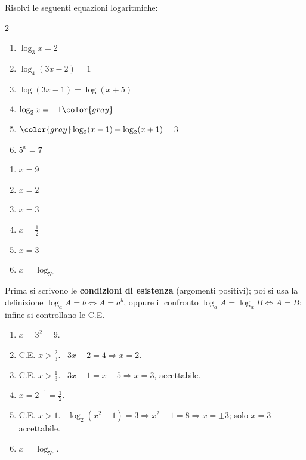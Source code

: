 
\begin{question}[ID=2.2, subtitle={Equazioni logaritmiche elementari (variante)}, difficulty=facile, tags={equazioni logaritmiche, definizione}]
Risolvi le seguenti equazioni logaritmiche:
\begin{center}\begin{minipage}{0.92\linewidth}
\begin{multicols}{2}
\begin{enumerate}[leftmargin=3.2cm]
\item $\log_3 x = 2$
\item $\log_4(3x-2) = 1$
\item $\log(3x-1) = \log(x+5)$
\item $\log_2 x = -1 \color{gray}$
\item $\color{gray}\log_2(x-1) + \log_2(x+1) = 3$
\item $5^x = 7$
\end{enumerate}
\end{multicols}
\end{minipage}\end{center}
\begin{solution}
\begin{enumerate}
    \item $x=9$
    \item $x=2$
    \item $x=3$
    \item $x=\tfrac12$
    \item $x=3$
    \item $x=\log_57$
\end{enumerate}
\end{solution}
\begin{explanation}
Prima si scrivono le \textbf{condizioni di esistenza} (argomenti positivi); poi si usa la definizione $\log_a A=b \iff A=a^b$, oppure il confronto $\log_aA=\log_aB \iff A=B$; infine si controllano le C.E.
\begin{enumerate}
    \item $x=3^2=9$.
    \item C.E. $x>\tfrac23$. \ $3x-2=4 \Rightarrow x=2$.
    \item C.E. $x>\tfrac13$. \ $3x-1=x+5 \Rightarrow x=3$, accettabile.
    \item $x=2^{-1}=\tfrac12$.
    \item C.E. $x>1$. \ $\log_2(x^2-1)=3 \Rightarrow x^2-1=8 \Rightarrow x=\pm3$; solo $x=3$ accettabile.
    \item $x=\log_57$.
\end{enumerate}
\end{explanation}
\end{question}

